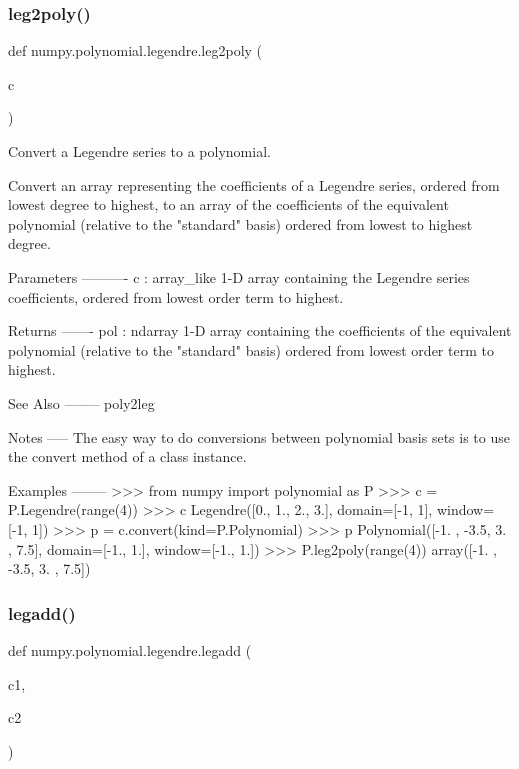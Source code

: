 \subsubsection{\texorpdfstring{leg2poly()}{leg2poly()}}
{\footnotesize\ttfamily def numpy.\+polynomial.\+legendre.\+leg2poly (\begin{DoxyParamCaption}\item[{}]{c }\end{DoxyParamCaption})}

\begin{DoxyVerb}Convert a Legendre series to a polynomial.

Convert an array representing the coefficients of a Legendre series,
ordered from lowest degree to highest, to an array of the coefficients
of the equivalent polynomial (relative to the "standard" basis) ordered
from lowest to highest degree.

Parameters
----------
c : array_like
    1-D array containing the Legendre series coefficients, ordered
    from lowest order term to highest.

Returns
-------
pol : ndarray
    1-D array containing the coefficients of the equivalent polynomial
    (relative to the "standard" basis) ordered from lowest order term
    to highest.

See Also
--------
poly2leg

Notes
-----
The easy way to do conversions between polynomial basis sets
is to use the convert method of a class instance.

Examples
--------
>>> from numpy import polynomial as P
>>> c = P.Legendre(range(4))
>>> c
Legendre([0., 1., 2., 3.], domain=[-1,  1], window=[-1,  1])
>>> p = c.convert(kind=P.Polynomial)
>>> p
Polynomial([-1. , -3.5,  3. ,  7.5], domain=[-1.,  1.], window=[-1.,  1.])
>>> P.leg2poly(range(4))
array([-1. , -3.5,  3. ,  7.5])\end{DoxyVerb}
 \mbox{\label{namespacenumpy_1_1polynomial_1_1legendre_a05031afb4d6c15bb84ba982a362b78c2}} 
\subsubsection{\texorpdfstring{legadd()}{legadd()}}
{\footnotesize\ttfamily def numpy.\+polynomial.\+legendre.\+legadd (\begin{DoxyParamCaption}\item[{}]{c1,  }\item[{}]{c2 }\end{DoxyParamCaption})}


